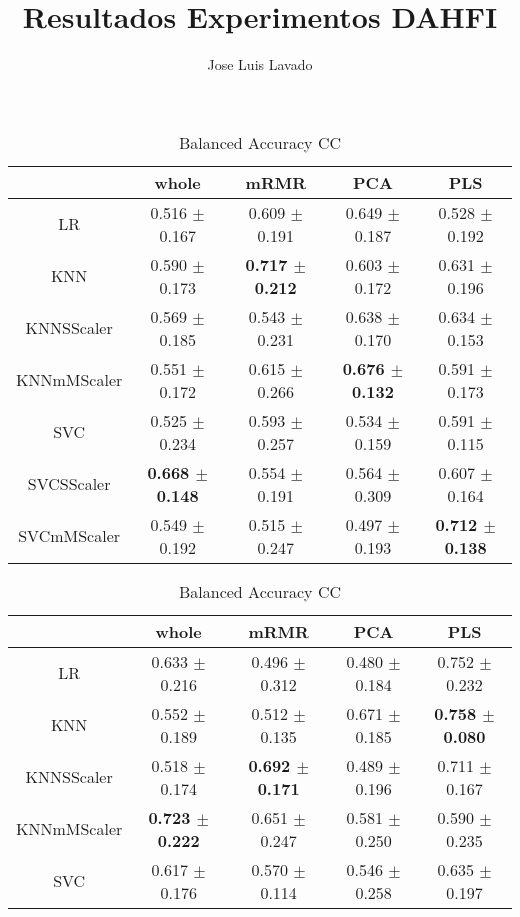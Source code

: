 \documentclass[]{report}
\title{Resultados Experimentos DAHFI}
\author{Jose Luis Lavado}
\begin{document}
\maketitle

	\begin{table}
		\centering
		\setlength{\aboverulesep}{0pt}
		\setlength{\belowrulesep}{0pt}
		\begin{tabular}{c|cccc}
			\hline
			             & whole           & mRMR            & PCA             & PLS             \\
			\hline
			 LR          & 0.516 $\pm$ 0.167 & 0.609 $\pm$ 0.191 & 0.649 $\pm$ 0.187 & 0.528 $\pm$ 0.192 \\
			 KNN         & 0.590 $\pm$ 0.173 & \textbf{0.717 $\pm$ 0.212} & 0.603 $\pm$ 0.172 & 0.631 $\pm$ 0.196 \\
			 KNNSScaler  & 0.569 $\pm$ 0.185 & 0.543 $\pm$ 0.231 & 0.638 $\pm$ 0.170 & 0.634 $\pm$ 0.153 \\
			 KNNmMScaler & 0.551 $\pm$ 0.172 & 0.615 $\pm$ 0.266 & \textbf{0.676 $\pm$ 0.132} & 0.591 $\pm$ 0.173 \\
			 SVC         & 0.525 $\pm$ 0.234 & 0.593 $\pm$ 0.257 & 0.534 $\pm$ 0.159 & 0.591 $\pm$ 0.115 \\
			 SVCSScaler  & \textbf{0.668 $\pm$ 0.148} & 0.554 $\pm$ 0.191 & 0.564 $\pm$ 0.309 & 0.607 $\pm$ 0.164 \\
			 SVCmMScaler & 0.549 $\pm$ 0.192 & 0.515 $\pm$ 0.247 & 0.497 $\pm$ 0.193 & \textbf{0.712 $\pm$ 0.138} \\
			\hline
		\end{tabular}
		\caption{\label{tab:bal_acc_CC} Balanced Accuracy CC}
		\vspace*{2cm}
		\begin{tabular}{c|cccc}
			\hline
			             & whole           & mRMR            & PCA             & PLS             \\
			\hline
			 LR          & 0.633 $\pm$ 0.216 & 0.496 $\pm$ 0.312 & 0.480 $\pm$ 0.184 & 0.752 $\pm$ 0.232 \\
			 KNN         & 0.552 $\pm$ 0.189 & 0.512 $\pm$ 0.135 & 0.671 $\pm$ 0.185 & \textbf{0.758 $\pm$ 0.080} \\
			 KNNSScaler  & 0.518 $\pm$ 0.174 & \textbf{0.692 $\pm$ 0.171} & 0.489 $\pm$ 0.196 & 0.711 $\pm$ 0.167 \\
			 KNNmMScaler & \textbf{0.723 $\pm$ 0.222} & 0.651 $\pm$ 0.247 & 0.581 $\pm$ 0.250 & 0.590 $\pm$ 0.235 \\
			 SVC         & 0.617 $\pm$ 0.176 & 0.570 $\pm$ 0.114 & 0.546 $\pm$ 0.258 & 0.635 $\pm$ 0.197 \\

\end{tabular}
\end{table}
\end{document}

